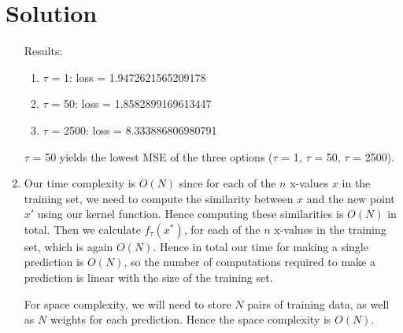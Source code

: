 \documentclass[submit]{harvardml}
\newenvironment{solution}
  {\color{magenta}\section*{Solution}}
{}
\begin{document}
\begin{solution}
\begin{enumerate}
    Results:
    \begin{enumerate}
        \item $\tau$ = 1: loss = 1.9472621565209178
        \item $\tau$ = 50: loss = 1.8582899169613447
        \item $\tau$ = 2500: loss = 8.333886806980791
    \end{enumerate}
    
    $\tau$ = 50 yields the lowest MSE of the three options ($\tau$ = 1, $\tau$ = 50, $\tau$ = 2500).

    \item Our time complexity is $O(N)$ since for each of the $n$ x-values $x$ in the training set, we need to compute the similarity between $x$ and the new point $x'$ using our kernel function. Hence computing these similarities is $O(N)$ in total. Then we calculate $f_{\tau}(x^*)$, for each of the $n$ x-values in the training set, which is again $O(N)$. Hence in total our time for making a single prediction is $O(N)$, so the number of computations required to make a prediction is linear with the size of the training set. 

    For space complexity, we will need to store $N$ pairs of training data, as well as $N$ weights for each prediction. Hence the space complexity is $O(N)$. 
    
\end{enumerate}

\end{solution}

\end{document}
